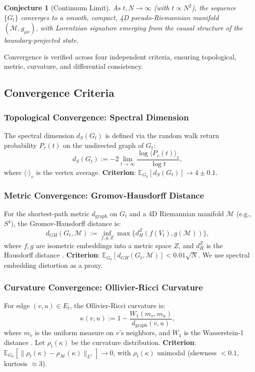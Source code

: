 \documentclass[11pt, a4paper]{article}
\newtheorem{conjecture}{Conjecture}[section]
\begin{document}
\begin{conjecture}[Continuum Limit]
\label{conj:continuum}
As $t, N \to \infty$ (with $t \propto N^2$), the sequence $\{G_t\}$ converges to a smooth, compact, 4D pseudo-Riemannian manifold $(\mathcal{M}, g_{\mu\nu})$, with Lorentzian signature emerging from the causal structure of the boundary-projected state.
\end{conjecture}

Convergence is verified across four independent criteria, ensuring topological, metric, curvature, and differential consistency.

\subsection{Convergence Criteria}

\subsubsection{Topological Convergence: Spectral Dimension}
The spectral dimension $d_S(G_t)$ is defined via the random walk return probability $P_v(t)$ on the undirected graph of $G_t$:
\[
d_S(G_t) := -2 \lim_{t \to \infty} \frac{\log \langle P_v(t) \rangle_v}{\log t},
\]
where $\langle \cdot \rangle_v$ is the vertex average. \textbf{Criterion}: $\mathbb{E}_{G_0} [d_S(G_t)] \to 4 \pm 0.1$.

\subsubsection{Metric Convergence: Gromov-Hausdorff Distance}
For the shortest-path metric $d_{\text{graph}}$ on $G_t$ and a 4D Riemannian manifold $\mathcal{M}$ (e.g., $S^4$), the Gromov-Hausdorff distance is:
\[
d_{GH}(G_t, \mathcal{M}) := \inf_{f, g, Z} \max \{ d_H^Z(f(V_t), g(\mathcal{M})) \},
\]
where $f, g$ are isometric embeddings into a metric space $Z$, and $d_H^Z$ is the Hausdorff distance \cite{burago2001}. \textbf{Criterion}: $\mathbb{E}_{G_0} [d_{GH}(G_t, \mathcal{M})] < 0.01 \sqrt{N}$. We use spectral embedding distortion as a proxy.

\subsubsection{Curvature Convergence: Ollivier-Ricci Curvature}
For edge $(v, u) \in E_t$, the Ollivier-Ricci curvature is:
\[
\kappa(v, u) := 1 - \frac{W_1(m_v, m_u)}{d_{\text{graph}}(v, u)},
\]
where $m_v$ is the uniform measure on $v$’s neighbors, and $W_1$ is the Wasserstein-1 distance \cite{ollivier2009}. Let $\rho_t(\kappa)$ be the curvature distribution. \textbf{Criterion}: $\mathbb{E}_{G_0} [ \| \rho_t(\kappa) - \rho_{\mathcal{M}}(\kappa) \|_{L^1} ] \to 0$, with $\rho_t(\kappa)$ unimodal (skewness $< 0.1$, kurtosis $\approx 3$).
\end{document}
